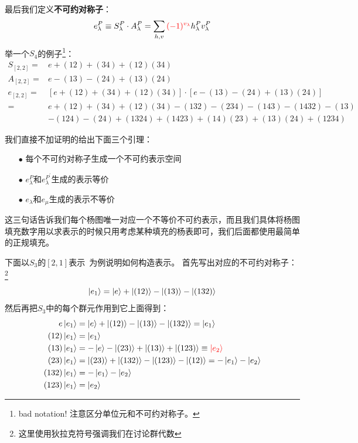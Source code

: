 最后我们定义\textbf{不可约对称子}：
\begin{equation}
	e_\lambda^P\equiv S_\lambda^P\cdot A_\lambda^P=\sum_{h,v} {\color{red}(-1)^{v_\lambda}}h^P_\lambda v_\lambda^P
\end{equation}
举一个$S_4$的例子\footnote{bad notation! 注意区分单位元和不可约对称子。}：
\begin{equation}
	\begin{aligned}
		S_{[2,2]}=&e+(12)+(34)+(12)(34)\\
		A_{[2,2]}=&e-(13)-(24)+(13)(24)\\
		e_{[2,2]}=&\left[e+(12)+(34)+(12)(34)\right]\cdot \left[e-(13)-(24)+(13)(24)\right]\\
		=&
		e+(12)+(34)+(12)(34)-(132)-(234)-(143)-(1432)-(13)\\&-(124)-(24)+(1324)+(1423)+(14)(23)+(13)(24)+(1234)
	\end{aligned}
\end{equation}

我们直接不加证明的给出下面三个引理：
\begin{itemize}
	\item [$\bullet$] 每个不可约对称子生成一个不可约表示空间
	\item [$\bullet$] $e^P_\lambda$和$e^{P^\prime}_\lambda$生成的表示等价
	\item [$\bullet$]  $e_\lambda$和$e_\mu$生成的表示不等价
\end{itemize}

这三句话告诉我们每个杨图唯一对应一个不等价不可约表示，而且我们具体将杨图填充数字用以求表示的时候只用考虑某种填充的杨表即可，我们后面都使用最简单的正规填充。

下面以$S_3$的$[2,1]$表示{\ }为例说明如何构造表示。
首先写出对应的不可约对称子：\footnote{这里使用狄拉克符号强调我们在讨论群代数}
\begin{equation}
	\ket{e_1}=\ket{e}+\ket{(12)}-\ket{(13)}-\ket{(132)}
\end{equation}
然后再把$S_3$中的每个群元作用到它上面得到：
\begin{equation}
	\begin{aligned}
		e\ket{e_1}&=\ket{e}+\ket{(12)}-\ket{(13)}-\ket{(132)}=\ket{e_1}\\
		(12)\ket{e_1}&=\ket{e_1}\\
		(13)\ket{e_1}&=-\ket{e}-\ket{(23)}+\ket{(13)}+\ket{(123)}\equiv{\color{red}\ket{e_2}}\\
		(23)\ket{e_1}&=\ket{(23)}+\ket{(132)}-\ket{(123)}-\ket{(12)}=-\ket{e_1}-\ket{e_2}\\
		(132)\ket{e_1}&=-\ket{e_1}-\ket{e_2}\\
		(123)\ket{e_1}&=\ket{e_2}
	\end{aligned}
\end{equation}

